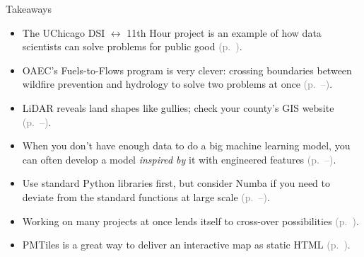 \documentclass[aspectratio=169]{beamer}
\begin{document}
\begin{frame}{Takeaways}
\vspace{0.5 cm}
\begin{itemize}\setlength{\itemsep}{0.3 cm}
\item The UChicago DSI $\leftrightarrow$ 11th Hour project is an example of how data scientists can solve problems for public good \textcolor{gray}{(p.~\pageref{page:background})}.
\item OAEC's Fuels-to-Flows program is very clever: crossing boundaries between wildfire prevention and hydrology to solve two problems at once \textcolor{gray}{(p.~\pageref{page:start-f2f}--\pageref{page:stop-f2f})}.
\item LiDAR reveals land shapes like gullies; check your county's GIS website \textcolor{gray}{(p.~\pageref{page:start-gully}--\pageref{page:stop-gully})}.
\item When you don't have enough data to do a big machine learning model, you can often develop a model \textit{inspired by} it with engineered features \textcolor{gray}{(p.~\pageref{page:start-method}--\pageref{page:stop-method})}.
\item Use standard Python libraries first, but consider Numba if you need to deviate from the standard functions at large scale \textcolor{gray}{(p.~\pageref{page:start-numba}--\pageref{page:stop-numba})}.
\item Working on many projects at once lends itself to cross-over possibilities \textcolor{gray}{(p.~\pageref{page:synergy})}.
\item PMTiles is a great way to deliver an interactive map as static HTML \textcolor{gray}{(p.~\pageref{page:pmtiles})}.
\end{itemize}
\end{frame}


\end{document}
